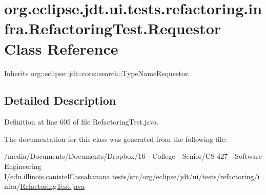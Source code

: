 \hypertarget{classorg_1_1eclipse_1_1jdt_1_1ui_1_1tests_1_1refactoring_1_1infra_1_1RefactoringTest_1_1Requestor}{
\section{org.eclipse.jdt.ui.tests.refactoring.infra.RefactoringTest.Requestor Class Reference}
\label{classorg_1_1eclipse_1_1jdt_1_1ui_1_1tests_1_1refactoring_1_1infra_1_1RefactoringTest_1_1Requestor}
}


Inherits org::eclipse::jdt::core::search::TypeNameRequestor.



\subsection{Detailed Description}


Definition at line 605 of file RefactoringTest.java.



The documentation for this class was generated from the following file:\begin{DoxyCompactItemize}
\item 
/media/Documents/Documents/Dropbox/16 -\/ College -\/ Senior/CS 427 -\/ Software Engineering I/edu.illinois.canistelCassabanana.tests/src/org/eclipse/jdt/ui/tests/refactoring/infra/\hyperlink{RefactoringTest_8java}{RefactoringTest.java}\end{DoxyCompactItemize}
